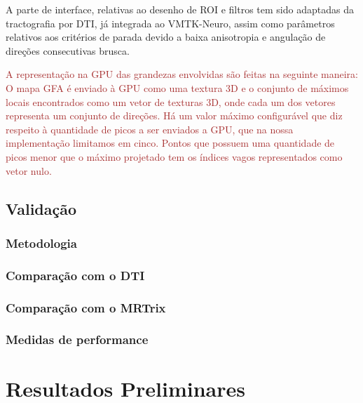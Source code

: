 \documentclass[
    12pt,                %
    oneside,            %
    a4paper,            %
    english,            %
    french,                %
    spanish,            %
    brazil                %
    ]{abntex2}
\begin{document}
A parte de interface, relativas ao desenho de ROI e filtros tem sido adaptadas da tractografia por DTI, já integrada ao VMTK-Neuro, assim como parâmetros relativos aos critérios de parada devido a baixa anisotropia e angulação de direções consecutivas brusca.

\textcolor{brown}{
A representação na GPU das grandezas envolvidas são feitas na seguinte maneira: O mapa GFA é enviado à GPU como uma textura 3D e o conjunto de máximos locais encontrados como um vetor de texturas 3D, onde cada um dos vetores representa um conjunto de direções. Há um valor máximo configurável que diz respeito à quantidade de picos a ser enviados a GPU, que na nossa implementação limitamos em cinco. Pontos que possuem uma quantidade de picos menor que o máximo projetado tem os índices vagos representados como vetor nulo.
}


\section{Validação}

\subsection{Metodologia}

\subsection{Comparação com o DTI}

\subsection{Comparação com o MRTrix}

\subsection{Medidas de performance}




\pagebreak

\chapter{Resultados Preliminares}

\end{document}
